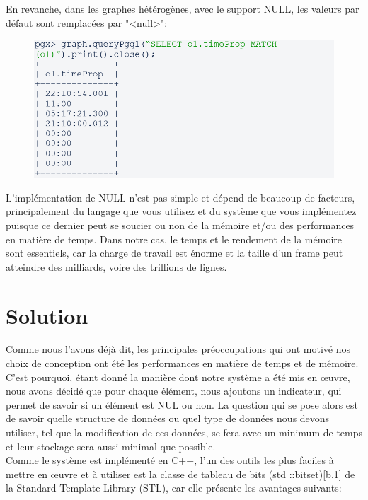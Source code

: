 En revanche, dans les graphes hétérogènes, avec le support NULL, les valeurs par défaut sont remplacées par "<null>":

\begin{figure}[H]  
  \centering
    \includegraphics[width=1\textwidth]{chapitre4/Figures/PGX_query.png}
\end{figure}

L'implémentation de NULL n'est pas simple et dépend de beaucoup de facteurs, principalement du langage que vous utilisez et du système que vous implémentez puisque ce dernier peut se soucier ou non de la mémoire et/ou des performances en matière de temps. Dans notre cas, le temps et le rendement de la mémoire sont essentiels, car la charge de travail est énorme et la taille d’un frame peut atteindre des milliards, voire des trillions de lignes.\\

\section{Solution}
Comme nous l'avons déjà dit, les principales préoccupations qui ont motivé nos choix de conception ont été les performances en matière de temps et de mémoire. C'est pourquoi, étant donné la manière dont notre système a été mis en œuvre, nous avons décidé que pour chaque élément, nous ajoutons un indicateur, qui permet de savoir si un élément est NUL ou non. La question qui se pose alors est de savoir quelle structure de données ou quel type de données nous devons utiliser, tel que la modification de ces données, se fera avec un minimum de temps et leur stockage sera aussi minimal que possible.\\
Comme le système est implémenté en C++, l'un des outils les plus faciles à mettre en œuvre et à utiliser est la classe de tableau de bits (std ::bitset)[b.1] de la Standard Template Library (STL), car elle présente les avantages suivants:


